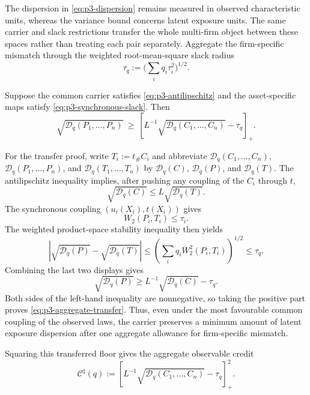 The dispersion in \eqref{eq:p3-dispersion} remains measured in observed
characteristic units, whereas the variance bound concerns latent exposure
units.
The same carrier and slack restrictions transfer the whole multi-firm object
between these spaces rather than treating each pair separately.
Aggregate the firm-specific mismatch through the weighted root-mean-square
slack radius
\begin{equation}\label{eq:p3-rms-slack}
  \tau_q:=\Big(\sum_i q_i\tau_i^2\Big)^{1/2}.
\end{equation}

\begin{theorem}
  \label{thm:p3-aggregate-transfer}
  Suppose the common carrier satisfies \eqref{eq:p3-antilipschitz} and the
  asset-specific maps satisfy \eqref{eq:p3-synchronous-slack}. Then
  \begin{equation}\label{eq:p3-aggregate-transfer}
    \sqrt{\mathcal D_q(P_1,\dots,P_n)}
    \ \ge\
    \left[
      L^{-1}\sqrt{\mathcal D_q(C_1,\dots,C_n)}-\tau_q
    \right]_+ .
  \end{equation}
\end{theorem}

For the transfer proof, write
$T_i:=t_\#C_i$ and abbreviate
$\mathcal D_q(C_1,\ldots,C_n)$,
$\mathcal D_q(P_1,\ldots,P_n)$, and
$\mathcal D_q(T_1,\ldots,T_n)$ by $\mathcal D_q(C)$,
$\mathcal D_q(P)$, and $\mathcal D_q(T)$.
The antilipschitz inequality implies, after pushing any coupling of the
$C_i$ through $t$,
\[
  \sqrt{\mathcal D_q(C)}
  \le L\sqrt{\mathcal D_q(T)}.
\]
The synchronous coupling $(u_i(X_i),t(X_i))$ gives
\[
  W_2(P_i,T_i)\le\tau_i.
\]
The weighted product-space stability inequality then yields
\[
  \left|\sqrt{\mathcal D_q(P)}-\sqrt{\mathcal D_q(T)}\right|
  \le\left(\sum_i q_i W_2^2(P_i,T_i)\right)^{1/2}
  \le\tau_q.
\]
Combining the last two displays gives
\[
  \sqrt{\mathcal D_q(P)}
  \ge L^{-1}\sqrt{\mathcal D_q(C)}-\tau_q.
\]
Both sides of the left-hand inequality are nonnegative, so taking the
positive part proves \eqref{eq:p3-aggregate-transfer}.
Thus, even under the most favourable common coupling of the observed laws, the
carrier preserves a minimum amount of latent exposure dispersion after one
aggregate allowance for firm-specific mismatch.

Squaring this transferred floor gives the aggregate observable credit
\begin{equation}\label{eq:p3-sharp-credit}
  \mathcal C^{\sharp}(q)
  :=\left[
    L^{-1}\sqrt{\mathcal D_q(C_1,\dots,C_n)}-\tau_q
  \right]_+^{2}.
\end{equation}

